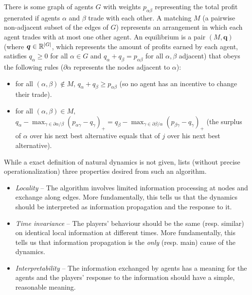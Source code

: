 \documentclass{article}
\begin{document}
\begin{definition}\label{def:bargaining}
    There is some graph of agents $G$ with weights $p_{\alpha\beta}$ representing the total profit generated if agents $\alpha$ and $\beta$ trade with each other. A matching $M$ (a pairwise non-adjacent subset of the edges of $G$) represents an arrangement in which each agent trades with at most one other agent. An equilibrium is a pair $(M,\bm{q})$ (where $\bm{q}\in\mathbb{R}^{|G|}$, which represents the amount of profits earned by each agent, satisfies $q_\alpha\ge 0$ for all $\alpha\in G$ and $q_\alpha+q_\beta=p_{\alpha\beta}$ for all $\alpha, \beta$ adjacent) that obeys the following rules ($\partial \alpha$ represents the nodes adjacent to $\alpha$):
    \begin{itemize}
        \item for all $(\alpha, \beta) \notin M$, $q_\alpha+q_\beta\ge p_{\alpha\beta}$ (so no agent has an incentive to change their trade).
        \item for all $(\alpha, \beta)\in M$, $q_\alpha-\max_{\gamma\in\partial \alpha/\beta}(p_{\alpha\gamma}-q_\gamma)_+=q_\beta-\max_{\gamma\in\partial \beta/\alpha}(p_{\beta\gamma}-q_\gamma)_+$ (the surplus of $\alpha$ over his next best alternative equals that of $j$ over his next best alternative).
    \end{itemize}
\end{definition}

While a exact definition of natural dynamics is not given, \cite{bayati3} lists (without precise operationalization) three properties desired from such an algorithm. 

\begin{itemize}
    \item \emph{Locality} -- The algorithm involves limited information processing at nodes and exchange along edges. More fundamentally, this tells us that the dynamics should be interpreted as information propagation and the response to it.
    \item \emph{Time invariance} -- The players' behaviour should be the same (resp. similar) on identical local information at different times. More fundamentally, this tells us that information propagation is the \emph{only} (resp. main) cause of the dynamics.
    \item \emph{Interpretability} -- The information exchanged by agents has a meaning for the agents and the players' response to the information should have a simple, reasonable meaning.
\end{itemize}
\end{document}
